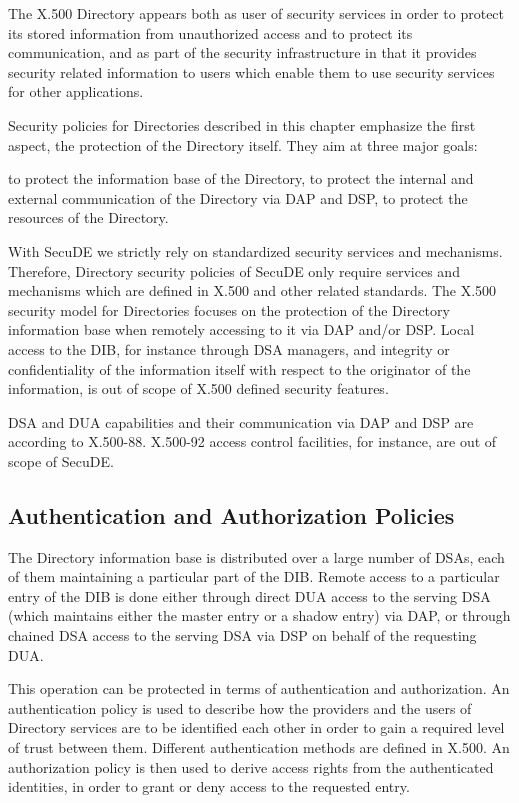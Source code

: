 The X.500 Directory appears both as user of security services in order to
protect its stored information from unauthorized access and to protect its 
communication, and as part of the security infrastructure in that it provides 
security related information to users which enable them to use security 
services for other applications.

Security policies for Directories described in this chapter emphasize the 
first aspect, the protection of the Directory itself. They aim at three 
major goals:

\be
\m to protect the information base of the Directory,
\m to protect the internal and external communication of the Directory
   via DAP and DSP,
\m to protect the resources of the Directory.
\ee

With SecuDE we strictly rely on standardized security services and 
mechanisms. Therefore, Directory security policies of SecuDE  only 
require services and mechanisms which are defined in X.500 and other 
related standards. The X.500 security model for Directories focuses on 
the protection of the Directory information base when remotely accessing 
to it via DAP and/or DSP. Local access to the DIB, for instance through
DSA managers, and integrity or confidentiality of the information itself 
with respect to the originator of the information, is out of scope of
X.500 defined security features.
 
DSA and DUA capabilities and their communication via DAP and DSP are 
according to X.500-88. X.500-92 access control facilities, for instance, 
are out of scope of SecuDE.


\subsection{Authentication and Authorization Policies}

The Directory information base is distributed over a large number of DSAs,
each of them maintaining a particular part of the DIB. Remote access to
a particular entry of the DIB is done either through direct DUA access
to the serving DSA (which maintains either the master entry or a shadow 
entry) via DAP, or through chained DSA access to the serving DSA via DSP 
on behalf of the requesting DUA.

This operation can be protected in terms of authentication and authorization.
An authentication policy is used to describe how the providers and the users
of Directory services are to be identified each other in order to gain a 
required level of trust between them. Different authentication methods are
defined in X.500. An authorization policy is then used to derive access rights 
from the authenticated identities, in order to grant or deny access to the
requested entry. 

